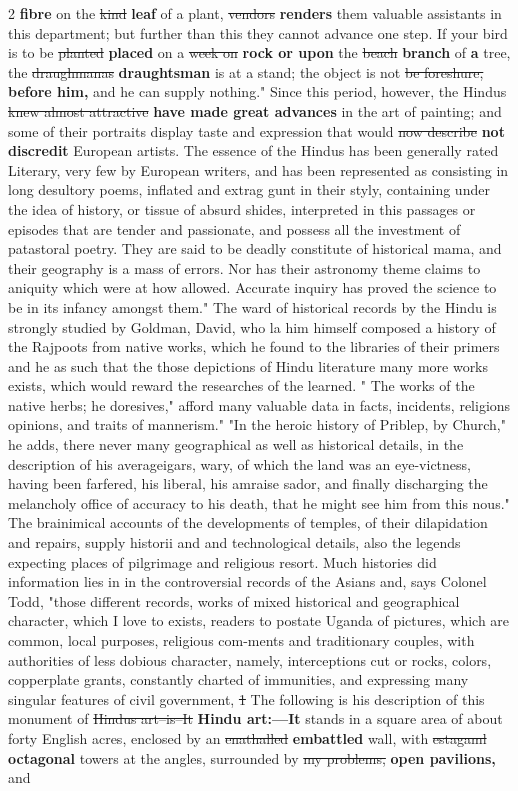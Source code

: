 \documentclass[10pt]{article}
\begin{document}
\begin{multicols}{2}
\textbf{fibre} on the \sout{kind} \textbf{leaf} of a plant, \sout{vendors} \textbf{renders} them valuable assistants in this department; but further than this they cannot advance one step. If your bird is to be \sout{planted} \textbf{placed} on a \sout{week on} \textbf{rock or upon} the \sout{beach} \textbf{branch} of \textbf{a} tree, the \sout{draughmanas} \textbf{draughtsman} is at a stand; the object is not \sout{be foreshure,} \textbf{before him,} and he can supply nothing." Since this period, however, the Hindus \sout{knew almost attractive} \textbf{have made great advances} in the art of painting; and some of their portraits display taste and expression that would \sout{now describe} \textbf{not discredit} European artists. The essence of the Hindus has been generally rated Literary, very few by European writers, and has been represented as consisting in long desultory poems, inflated and extrag gunt in their styly, containing under the idea of history, or tissue of absurd shides, interpreted in this passages or episodes that are tender and passionate, and possess all the investment of patastoral poetry. They are said to be deadly constitute of historical mama, and their geography is a mass of errors. Nor has their astronomy theme claims to aniquity which were at how allowed. Accurate inquiry has proved the science to be in its infancy amongst them." The ward of historical records by the Hindu is strongly studied by Goldman, David, who la him himself composed a history of the Rajpoots from native works, which he found to the libraries of their primers and he as such that the those depictions of Hindu literature many more works exists, which would reward the researches of the learned. " The works of the native herbs; he doresives," afford many valuable data in facts, incidents, religions opinions, and traits of mannerism." "In the heroic history of Priblep, by Church," he adds, there never many geographical as well as historical details, in the description of his averageigars, wary, of which the land was an eye-victness, having been farfered, his liberal, his amraise sador, and finally discharging the melancholy office of accuracy to his death, that he might see him from this nous." The brainimical accounts of the developments of temples, of their dilapidation and repairs, supply historii and and technological details, also the legends expecting places of pilgrimage and religious resort. Much histories did information lies in in the controversial records of the Asians and, says Colonel Todd, "those different records, works of mixed historical and geographical character, which I love to exists, readers to postate Uganda of pictures, which are common, local purposes, religious com-ments and traditionary couples, with authorities of less dobious character, namely, interceptions cut or rocks, colors, copperplate grants, constantly charted of immunities, and expressing many singular features of civil government, \sout{1} The following is his description of this monument of \sout{Hindus art--is--It} \textbf{Hindu art:—It} stands in a square area of about forty English acres, enclosed by an \sout{enathalled} \textbf{embattled} wall, with \sout{estagaml} \textbf{octagonal} towers at the angles, surrounded by \sout{my problems,} \textbf{open pavilions,} and 
\end{multicols}
\end{document}
